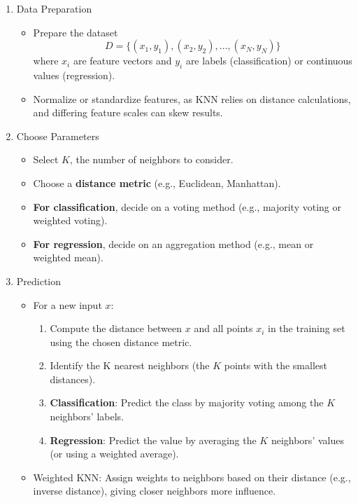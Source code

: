 \begin{enumerate}[label=Step \arabic*:, align=left, leftmargin=20pt,labelsep=1em]
    \item Data Preparation
    \begin{itemize}
        \item Prepare the dataset
        \[D = \{(x_1, y_1), (x_2, y_2), \dots, (x_N, y_N)\}\]
        where $x_i$ are feature vectors and $y_i$ are labels (classification) or continuous values (regression).
        \item Normalize or standardize features, as KNN relies on distance calculations, and differing feature scales can skew results.
    \end{itemize}

    \item Choose Parameters
    \begin{itemize}
        \item Select $K$, the number of neighbors to consider.
        \item Choose a \textbf{distance metric} (e.g., Euclidean, Manhattan).
        \item \textbf{For classification}, decide on a voting method (e.g., majority voting or weighted voting).
        \item \textbf{For regression}, decide on an aggregation method (e.g., mean or weighted mean).
    \end{itemize}

    \item Prediction
    \begin{itemize}
        \item For a new input $x$:
        \begin{enumerate}
            \item Compute the distance between $x$ and all points $x_i$ in the training set using the chosen distance metric.
            \item Identify the K nearest neighbors (the $K$ points with the smallest distances).
            \item \textbf{Classification}: Predict the class by majority voting among the $K$ neighbors' labels.
            \item \textbf{Regression}: Predict the value by averaging the $K$ neighbors' values (or using a weighted average).
        \end{enumerate}
        \item Weighted KNN: Assign weights to neighbors based on their distance (e.g., inverse distance), giving closer neighbors more influence.
    \end{itemize}
\end{enumerate}


